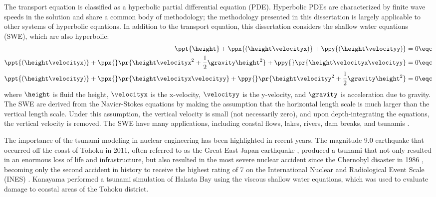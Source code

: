 The transport equation is classified as a hyperbolic partial differential
equation (PDE). Hyperbolic PDEs are characterized by finite wave speeds
in the solution and share a common body of methodology; the methodology
presented in this dissertation is largely applicable to other systems of
hyperbolic equations. In addition to the transport equation, this
dissertation considers the shallow water equations (SWE), which are
also hyperbolic:
\begin{subequations}
\begin{align}
  \ppt{\height} + \ppx{(\height\velocityx)} + \ppy{(\height\velocityy)} &= 0
  \eqc\\
  \ppt{(\height\velocityx)}
    + \ppx{}\pr{\height\velocityx^2 + \frac{1}{2}\gravity\height^2}
    + \ppy{}\pr{\height\velocityx\velocityy} &= 0
  \eqc\\
  \ppt{(\height\velocityy)}
    + \ppx{}\pr{\height\velocityx\velocityy}
    + \ppy{}\pr{\height\velocityy^2 + \frac{1}{2}\gravity\height^2} &= 0
  \eqc
\end{align}
\end{subequations}
where $\height$ is fluid the height, $\velocityx$ is the x-velocity,
$\velocityy$ is the y-velocity, and $\gravity$ is acceleration due to
gravity.
The SWE are derived from the Navier-Stokes
equations by making the assumption that the horizontal length
scale is much larger than the vertical length scale. Under this
assumption, the vertical velocity is small (not necessarily zero),
and upon depth-integrating the equations, the vertical velocity
is removed. The SWE have many applications, including coastal
flows, lakes, rivers, dam breaks, and tsunamis \cite{kirby}.


The importance of the tsunami modeling in nuclear engineering has
been highlighted in recent years.
The magnitude 9.0 earthquake that occurred off the coast of Tohoku in 2011,
often referred to as the Great East Japan earthquake \cite{USGS_tohoku},
produced a tsunami that not only
resulted in an enormous loss of life and infrastructure, but
also resulted in the most severe nuclear accident since the Chernobyl
disaster in 1986 \cite{IAEAfukushima}, becoming only the second
accident in history to receive the highest rating of 7 on the International
Nuclear and Radiological Event Scale (INES) \cite{IAEA_fukushima_scale}.
Kanayama \cite{Kanayama2013} performed a tsunami simulation of
Hakata Bay using the viscous shallow water equations, which was
used to evaluate damage to coastal areas of the Tohoku district.
